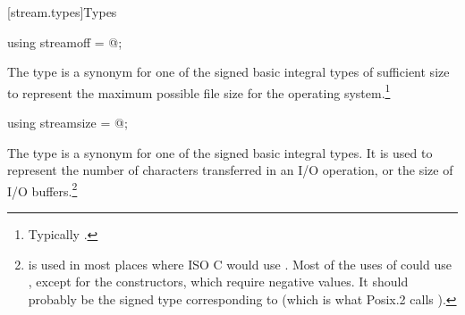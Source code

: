 [stream.types]{Types}

%
\begin{itemdecl}
using streamoff = @\impdef@;
\end{itemdecl}

\begin{itemdescr}
\pnum
The type  is a synonym for one of the signed basic integral types of
sufficient size to represent the maximum possible file size for the operating system.\footnote{Typically .}
\end{itemdescr}

%
\begin{itemdecl}
using streamsize = @\impdef@;
\end{itemdecl}

\begin{itemdescr}
\pnum
The type
is a synonym for one of the signed basic
integral types.
It is used to represent the number of characters transferred in an I/O
operation, or the size of I/O buffers.\footnote{
is used in most places where ISO C would use
.
Most of the uses of
could use
,
except for the
constructors, which require negative values.
It should probably be the signed type corresponding to
(which is what Posix.2 calls
).}
\end{itemdescr}

